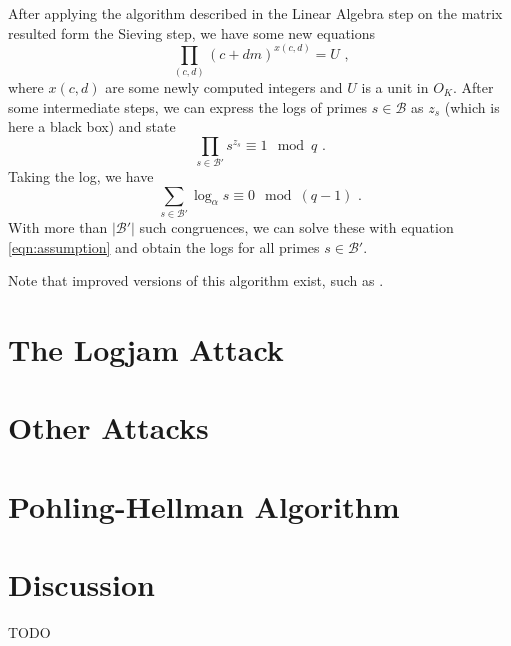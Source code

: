 \documentclass[paper=a4, fontsize=11pt]{scrartcl} %
\numberwithin{equation}{section} %
\numberwithin{figure}{section} %
\numberwithin{table}{section} %
\begin{document}
After applying the algorithm described in the Linear Algebra step on the matrix resulted form the Sieving step, we have some new equations
\begin{equation}
\prod_{(c,d)}(c+dm)^{x(c,d)} = U
\textit{ ,}
\end{equation}
where $x(c,d)$ are some newly computed integers and $U$ is a unit in $O_K$. After some intermediate steps, we can express the logs of primes $s\in\mathcal{B}$ as $z_s$ (which is here a black box) and state
\begin{equation}
\prod_{s\in\mathcal{B}'}s^{z_s}\equiv 1\mod q
\text{ .}
\end{equation}
Taking the log, we have
\begin{equation}
\sum_{s\in\mathcal{B}'}\log_\alpha s \equiv 0 \mod (q-1)
\text{ .}
\end{equation}
With more than $|\mathcal{B}'|$ such congruences, we can solve these with equation \ref{eqn:assumption} and obtain the logs for all primes $s\in\mathcal{B}'$.

Note that improved versions of this algorithm exist, such as \citep{joux2003improvements}.

\section{The Logjam Attack}



\section{Other Attacks}

\section{Pohling-Hellman Algorithm}

\section{Discussion}
TODO

\newpage


\end{document}
